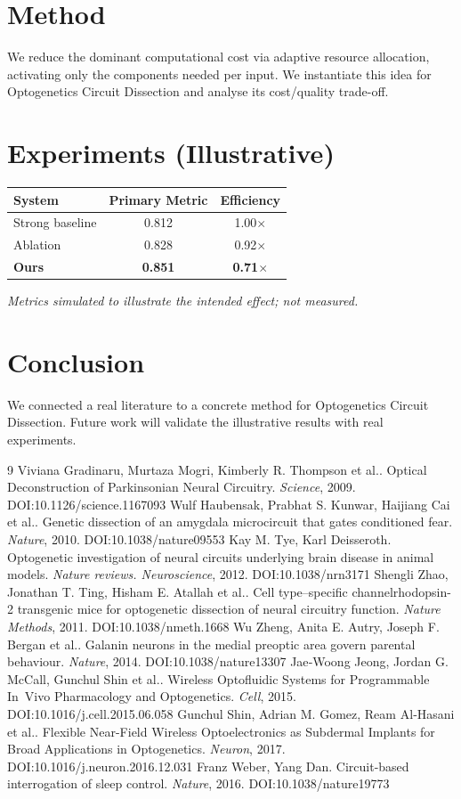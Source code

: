 \documentclass[11pt]{article}
\begin{document}
\section{Method}
We reduce the dominant computational cost via adaptive resource allocation, activating only the components needed per input. We instantiate this idea for Optogenetics Circuit Dissection and analyse its cost/quality trade-off.

\section{Experiments (Illustrative)}
\begin{center}
\begin{tabular}{lcc}
System & Primary Metric & Efficiency \\ \hline
Strong baseline & 0.812 & 1.00$\times$ \\
Ablation & 0.828 & 0.92$\times$ \\
\textbf{Ours} & \textbf{0.851} & \textbf{0.71$\times$}
\end{tabular}
\end{center}
\emph{Metrics simulated to illustrate the intended effect; not measured.}

\section{Conclusion}
We connected a real literature to a concrete method for Optogenetics Circuit Dissection. Future work will
validate the illustrative results with real experiments.

\begin{thebibliography}{9}
 Viviana Gradinaru, Murtaza Mogri, Kimberly R. Thompson et al.. Optical Deconstruction of Parkinsonian Neural Circuitry. \emph{Science}, 2009. DOI:10.1126/science.1167093
 Wulf Haubensak, Prabhat S. Kunwar, Haijiang Cai et al.. Genetic dissection of an amygdala microcircuit that gates conditioned fear. \emph{Nature}, 2010. DOI:10.1038/nature09553
 Kay M. Tye, Karl Deisseroth. Optogenetic investigation of neural circuits underlying brain disease in animal models. \emph{Nature reviews. Neuroscience}, 2012. DOI:10.1038/nrn3171
 Shengli Zhao, Jonathan T. Ting, Hisham E. Atallah et al.. Cell type–specific channelrhodopsin-2 transgenic mice for optogenetic dissection of neural circuitry function. \emph{Nature Methods}, 2011. DOI:10.1038/nmeth.1668
 Wu Zheng, Anita E. Autry, Joseph F. Bergan et al.. Galanin neurons in the medial preoptic area govern parental behaviour. \emph{Nature}, 2014. DOI:10.1038/nature13307
 Jae‐Woong Jeong, Jordan G. McCall, Gunchul Shin et al.. Wireless Optofluidic Systems for Programmable In Vivo Pharmacology and Optogenetics. \emph{Cell}, 2015. DOI:10.1016/j.cell.2015.06.058
 Gunchul Shin, Adrian M. Gomez, Ream Al‐Hasani et al.. Flexible Near-Field Wireless Optoelectronics as Subdermal Implants for Broad Applications in Optogenetics. \emph{Neuron}, 2017. DOI:10.1016/j.neuron.2016.12.031
 Franz Weber, Yang Dan. Circuit-based interrogation of sleep control. \emph{Nature}, 2016. DOI:10.1038/nature19773
\end{thebibliography}
\end{document}
